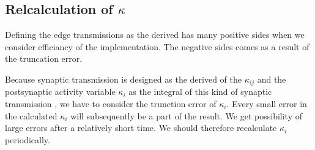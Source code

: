 

	



	
	




		\subsection{Relcalculation of $\kappa$}
		\label{ssecRecalcKappa}
		Defining the edge transmissions as the derived has many positive sides when we consider efficiancy of the implementation. 
		The negative sides comes as a result of the truncation error.




		Because synaptic transmission is designed as the derived of the $\kappa_{ij}$ and the postsynaptic activity variable $\kappa_i$ as the integral of this kind of synaptic transmission
			, we have to consider the trunction error of $\kappa_i$. 
		Every small error in the calculated $\kappa_i$ will subsequently be a part of the result.
		We get possibility of large errors after a relatively short time.
		We should therefore recalculate $\kappa_i$ periodically.



